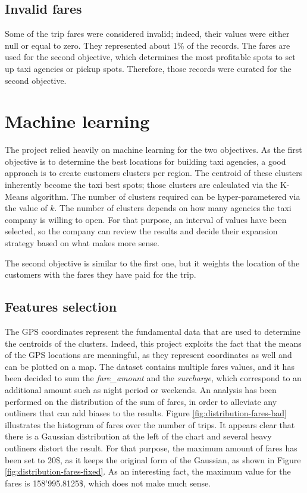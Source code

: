 \documentclass[a4paper]{article}
\begin{document}
\subsection{Invalid fares}
Some of the trip fares were considered invalid; indeed, their values were either null or equal to zero. They represented about 1\% of the records. The fares are used for the second objective, which determines the most profitable spots to set up taxi agencies or pickup spots. Therefore, those records were curated for the second objective.

\section{Machine learning}
The project relied heavily on machine learning for the two objectives. As the first objective is to determine the best locations for building taxi agencies, a good approach is to create customers clusters per region. The centroid of these clusters inherently become the taxi best spots; those clusters are calculated via the K-Means algorithm. The number of clusters required can be hyper-parametered via the value of $k$. The number of clusters depends on how many agencies the taxi company is willing to open. For that purpose, an interval of values have been selected, so the company can review the results and decide their expansion strategy based on what makes more sense.

The second objective is similar to the first one, but it weights the location of the customers with the fares they have paid for the trip.



\subsection{Features selection}
The GPS coordinates represent the fundamental data that are used to determine the centroids of the clusters. Indeed, this project exploits the fact that the means of the GPS locations are meaningful, as they represent coordinates as well and can be plotted on a map. The dataset contains multiple fares values, and it has been decided to sum the \emph{fare\_amount} and the \emph{surcharge}, which correspond to an additional amount such as night period or weekends. An analysis has been performed on the distribution of the sum of fares, in order to alleviate any outliners that can add biases to the results. Figure \ref{fig:distribution-fares-bad} illustrates the histogram of fares over the number of trips. It appears clear that there is a Gaussian distribution at the left of the chart and several heavy outliners distort the result. For that purpose, the maximum amount of fares has been set to 20\$, as it keeps the original form of the Gaussian, as shown in Figure \ref{fig:distribution-fares-fixed}. As an interesting fact, the maximum value for the fares is 158'995.8125\$, which does not make much sense.
\end{document}
